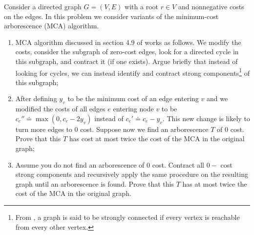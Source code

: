 \documentclass[11pt]{article}
\theoremstyle{numberplain}
\theoremstyle{nonumberplain}
\newcommand{\0}{{\mathbf{0}}}
\begin{document}
\begin{ques} Consider a directed graph $G=(V,E)$ with a root $r\in V$ and nonnegative costs on the edges. In this problem we consider variants of the minimum-cost arborescence (MCA) algorithm.
\begin{enumerate}
\item MCA algorithm discussed in section 4.9 of \cite{jon2005algorithm} works as follows. We modify the costs, consider the subgraph of zero-cost edges, look for a directed cycle in this subgraph, and contract it (if one exists). Argue briefly that instead of looking for cycles, we can instead identify and contract strong components\footnote{From \cite{wikipedia}, a graph is said to be strongly connected if every vertex is reachable from every other vertex.} of this subgraph;
\item  After defining $y_v$ to be the minimum cost of an edge entering $v$ and we modified the costs of all edges $e$ entering node $v$ to be $c_e''\doteq \max (0,c_e-2y_v)$ instead of $c_e'\doteq c_e-y_v$. This new change is likely to turn more edges to $0$ cost. Suppose now we find an arborescence $T$ of $0$ cost. Prove that this $T$ has cost at most twice the cost of the MCA in the original graph;
\item Assume you do not find an arborescence of $0$ cost. Contract all $0-$ cost strong components and recursively apply the same procedure on the resulting graph until an arborescence is found. Prove that this $T$ has at most twice the cost of the MCA in the original graph.
\end{enumerate}
\end{ques}
\end{document}
